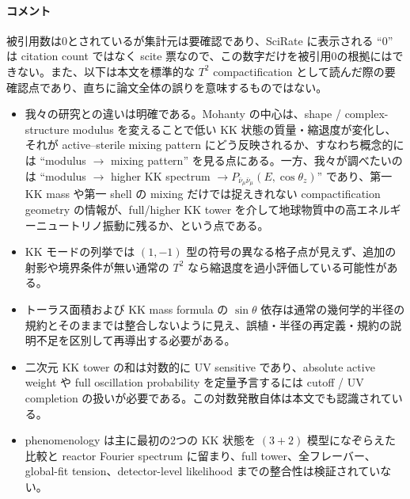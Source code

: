 \paragraph{コメント}
被引用数は0とされているが集計元は要確認であり、SciRate に表示される ``0'' は citation count ではなく scite 票なので、この数字だけを被引用0の根拠にはできない。また、以下は本文を標準的な $T^2$ compactification として読んだ際の要確認点であり、直ちに論文全体の誤りを意味するものではない。
\begin{itemize}
  \item 我々の研究との違いは明確である。Mohanty の中心は、shape / complex-structure modulus を変えることで低い KK 状態の質量・縮退度が変化し、それが active--sterile mixing pattern にどう反映されるか、すなわち概念的には ``modulus $\to$ mixing pattern'' を見る点にある。一方、我々が調べたいのは ``modulus $\to$ higher KK spectrum $\to P_{\bar\nu_\mu\bar\nu_\mu}(E,\cos\theta_z)$'' であり、第一 KK mass や第一 shell の mixing だけでは捉えきれない compactification geometry の情報が、full/higher KK tower を介して地球物質中の高エネルギーニュートリノ振動に残るか、という点である。
  \item KK モードの列挙では $(1,-1)$ 型の符号の異なる格子点が見えず、追加の射影や境界条件が無い通常の $T^2$ なら縮退度を過小評価している可能性がある。
  \item トーラス面積および KK mass formula の $\sin\theta$ 依存は通常の幾何学的半径の規約とそのままでは整合しないように見え、誤植・半径の再定義・規約の説明不足を区別して再導出する必要がある。
  \item 二次元 KK tower の和は対数的に UV sensitive であり、absolute active weight や full oscillation probability を定量予言するには cutoff / UV completion の扱いが必要である。この対数発散自体は本文でも認識されている。
  \item phenomenology は主に最初の2つの KK 状態を $(3+2)$ 模型になぞらえた比較と reactor Fourier spectrum に留まり、full tower、全フレーバー、global-fit tension、detector-level likelihood までの整合性は検証されていない。
\end{itemize}
